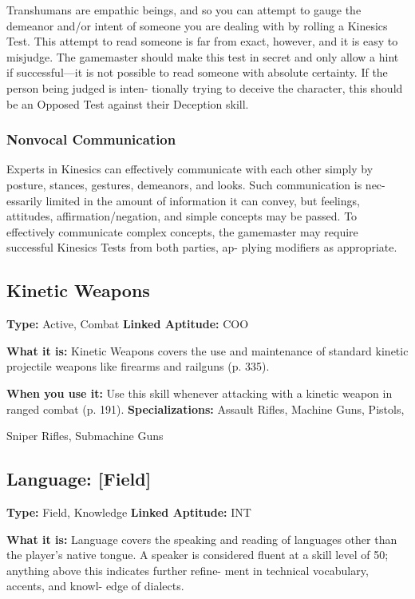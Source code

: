 Transhumans are empathic beings, and so you can 
attempt to gauge the demeanor and/or intent of 
someone you are dealing with by rolling a Kinesics 
Test. This attempt to read someone is far from exact, 
however, and it is easy to misjudge. The gamemaster 
should make this test in secret and only allow a hint 
if successful—it is not possible to read someone with 
absolute certainty. If the person being judged is inten-
tionally trying to deceive the character, this should be 
an Opposed Test against their Deception skill.

\subsubsection{Nonvocal Communication}

Experts in Kinesics can effectively communicate 
with each other simply by posture, stances, gestures, 
demeanors, and looks. Such communication is nec-
essarily limited in the amount of information it can 
convey, but feelings, attitudes, affirmation/negation, 
and simple concepts may be passed. To effectively 
communicate complex concepts, the gamemaster may 
require successful Kinesics Tests from both parties, ap-
plying modifiers as appropriate.

\subsection{Kinetic Weapons}

\textbf{Type:} Active, Combat
\textbf{Linked Aptitude:} COO

\textbf{What it is:} Kinetic Weapons covers the use and 
maintenance of standard kinetic projectile weapons 
like firearms and railguns (p. 335).

\textbf{When you use it:} Use this skill whenever attacking 
with a kinetic weapon in ranged combat (p. 191).
\textbf{Specializations:} Assault Rifles, Machine Guns, Pistols, 

Sniper Rifles, Submachine Guns

\subsection{Language: [Field]}

\textbf{Type:} Field, Knowledge
\textbf{Linked Aptitude:} INT

\textbf{What it is:} Language covers the speaking and 
reading of languages other than the player's native 
tongue. A speaker is considered fluent at a skill level 
of 50; anything above this indicates further refine-
ment in technical vocabulary, accents, and knowl-
edge of dialects.

